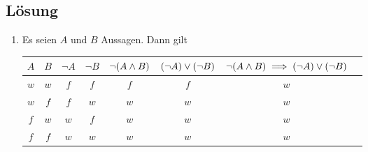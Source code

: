 \documentclass[german,12pt]{homework}
\DeclarePairedDelimiter{\enbrace}{(}{)}
\begin{document}
    \subsection*{Lösung}
    \begin{enumerate}
        \item Es seien \(A\) und \(B\) Aussagen. Dann gilt
        \begin{center}
            \begin{tabular}{cccccccc}
                \toprule
                \(A\) & \(B\) & \(\lnot{A}\) & \(\lnot{B}\) &
                \(\lnot\enbrace*{A \land B}\) & \(\enbrace*{\lnot{A}} \lor
                \enbrace*{\lnot{B}}\) & \(\lnot\enbrace*{A \land B} \implies
                \enbrace*{\lnot{A}} \lor \enbrace*{\lnot{B}}\)\\
                \midrule
                \(w\) & \(w\) & \(f\) & \(f\) & \(f\) & \(f\) & \(w\)\\
                \(w\) & \(f\) & \(f\) & \(w\) & \(w\) & \(w\) & \(w\)\\
                \(f\) & \(w\) & \(w\) & \(f\) & \(w\) & \(w\) & \(w\)\\
                \(f\) & \(f\) & \(w\) & \(w\) & \(w\) & \(w\) & \(w\)\\
                \bottomrule
            \end{tabular}

            \vspace{.2in}


\end{center}
\end{enumerate}
\end{document}
